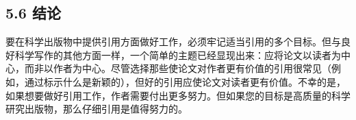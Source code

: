 \subsection*{5.6 结论}
要在科学出版物中提供引用方面做好工作，必须牢记适当引用的多个目标。但与良好科学写作的其他方面一样，一个简单的主题已经显现出来：应将论文以读者为中心，而非以作者为中心。尽管选择那些使论文对作者更有价值的引用很常见（例如，通过标示什么是新颖的），但好的引用应使论文对读者更有价值。不幸的是，如果想要做好引用工作，作者需要付出更多努力。但如果您的目标是高质量的科学研究出版物，那么仔细引用是值得努力的。

